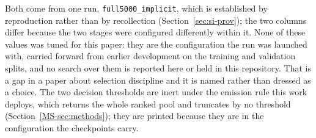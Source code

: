 \begin{table}[h]
\begin{threeparttable}
\begin{tabular}{lll}
\bottomrule
\end{tabular}
\begin{tablenotes}[flushleft]\footnotesize
\item Both come from one run, \texttt{full5000\_implicit}, which is established by reproduction rather than by recollection (Section~\ref{sec:si-prov}); the two columns differ because the two stages were configured differently within it. None of these values was tuned for this paper: they are the configuration the run was launched with, carried forward from earlier development on the training and validation splits, and no search over them is reported here or held in this repository. That is a gap in a paper about selection discipline and it is named rather than dressed as a choice. The two decision thresholds are inert under the emission rule this work deploys, which returns the whole ranked pool and truncates by no threshold (Section~\ref{MS-sec:methods}); they are printed because they are in the configuration the checkpoints carry.
\end{tablenotes}
\end{threeparttable}
\end{table}
